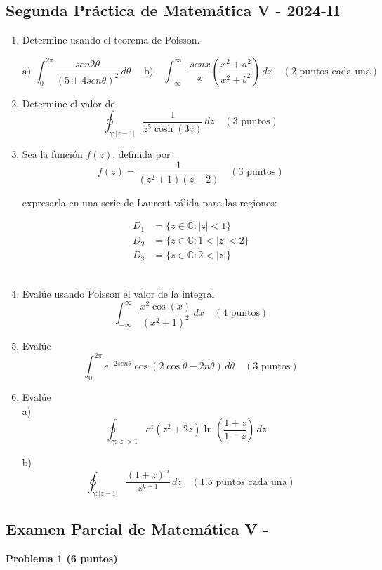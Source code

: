 \documentclass[a4paper,12pt]{article}
\begin{document}
\subsection{Segunda Práctica de Matemática V - 2024-II}
\begin{enumerate}
    \item Determine usando el teorema de Poisson.
    
    \[
    \text{a) }\int_{0}^{2\pi} \frac{sen2\theta}{(5+4sen\theta)^{2}} \, d\theta \quad  \text{ b)} \quad \int_{-\infty}^{\infty} \frac{sen x}{x}(\frac{x^{2}+a^{2}}{x^{2}+b^{2}}) \, dx \quad (2 \text{ puntos cada una})
    \]
    
    \item Determine el valor de 
    \[
    \oint_{\gamma: |z-1|} \frac{1}{z^5\cosh(3z) } \, dz \quad (3 \text{ puntos})
    \]
    
    \item Sea la función \( f(z) \), definida por \[f(z) = \frac{1}{(z^2+1)(z-2)} \quad (3 \text{ puntos})
    \]
    
    expresarla en una serie de Laurent válida para las regiones:
    
    \[
    \begin{align*}
    D_1 &= \{z \in \mathbb{C} \colon |z| < 1\} \\
    D_2 &= \{z \in \mathbb{C} \colon 1 < |z| < 2\} \\
    D_3 &= \{z \in \mathbb{C} \colon 2 < |z|\}
    \end{align*}
    \]\\
    
    \item Evalúe usando Poisson el valor de la integral 
    \[
    \int_{-\infty}^{\infty} \frac{x^2\cos(x)}{(x^{2}+1)^{2}} \, dx \quad (4 \text{ puntos})
    \]
    
    \item Evalúe 
    \[
    \int_{0}^{2\pi} e^{-2sen \theta} \cos(2\cos \theta - 2n \theta) \, d\theta \quad (3 \text{ puntos})
    \]
    
    \item Evalúe \\
    
    a) \[\oint_{\gamma:|z|>1} {e^z}{(z^2+2z)} \ln(\frac{1+z}{1-z}) \, dz \quad\]
    
    b) \[\oint_{\gamma: |z-1|} \frac{(1+z)^n}{z^{k+1}} \, dz \quad (1.5 \text{ puntos cada una})\]
    
\end{enumerate}
\subsection{Examen Parcial de Matemática V - }
{\bf Problema 1 (6 puntos)}
\end{document}
